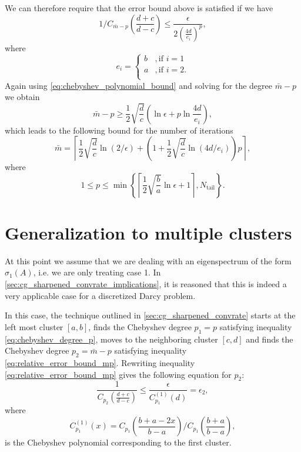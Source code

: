 We can therefore require that the error bound above is satisfied if we have
\[
    1/C_{\bar{m}-p}\left(\frac{d+c}{d-c}\right) \leq \frac{\epsilon}{2\left( \frac{4d}{e_i}\right)^p},
\]
where 
\[
    e_i = \begin{cases}
        b &, \text{if } i = 1\\
        a &, \text{if } i = 2.\\
    \end{cases}
\]
Again using \cref{eq:chebyshev_polynomial_bound} and solving for the degree $\bar{m} - p$ we obtain
\[
    \bar{m} - p \geq \frac{1}{2}\sqrt{\frac{d}{c}}\left(\ln{\epsilon} + p \ln{\frac{4d}{e_i}}\right),
\]
which leads to the following bound for the number of iterations \cite[Equation 4.4]{cg_sharpened_convrate_Axelsson1976}
\begin{equation}
    \bar{m}=\left\lceil\frac{1}{2} \sqrt{\frac{d}{c}} \ln (2 / \epsilon)+\left(1+\frac{1}{2} \sqrt{\frac{d}{c}} \ln (4 d / e_i)\right) p\right\rceil,
    \label{eq:cg_iteration_bound_2_clusters}
\end{equation}
where 
\[
    1 \leq p \leq \min\left\{\left\lceil\frac{1}{2}\sqrt{\frac{b}{a}}\ln{\epsilon} + 1\right\rceil, N_{\text{tail}}\right\}.
\]

\section{Generalization to multiple clusters}\label{sec:multiple_clusters}
At this point we assume that we are dealing with an eigenspectrum of the form $\sigma_1(A)$, i.e. we are only treating case 1. In \cref{sec:cg_sharpened_convrate_implications}, it is reasoned that this is indeed a very applicable case for a discretized Darcy problem.

In this case, the technique outlined in \cref{sec:cg_sharpened_convrate} starts at the left most cluster $[a,b]$, finds the Chebyshev degree $p_1=p$ satisfying inequality \ref{eq:chebyshev_degree_p}, moves to the neighboring cluster $[c,d]$ and finds the Chebyshev degree $p_2 = \bar{m} - p$ satisfying inequality \ref{eq:relative_error_bound_mp}. Rewriting inequality \ref{eq:relative_error_bound_mp} gives the following equation for $p_2$:
\begin{equation}
    \frac{1}{C_{p_2}\left(\frac{d+c}{d-c}\right)} \leq \frac{\epsilon}{{C}^{(1)}_{p_1}(d)} = \epsilon_2,
    \label{eq:chebyshev_degree_p_prime}
\end{equation}
where
\[
    C^{(1)}_{p_1}(x) = C_{p_1}\left(\frac{b + a - 2x}{b - a}\right) /C_{p_1}\left(\frac{b+a}{b-a}\right),
\]
is the Chebyshev polynomial corresponding to the first cluster.

